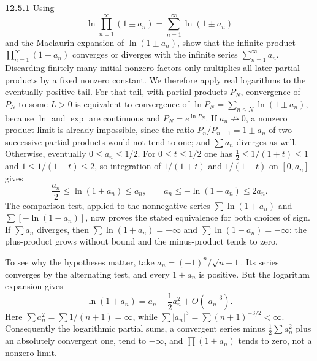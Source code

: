 \par\bigskip
\noindent\textbf{12.5.1}\quad {} Using
\[
\ln\prod_{n=1}^{\infty}(1\pm a_{n})=\sum_{n=1}^{\infty}\ln(1\pm a_{n})
\]
and the Maclaurin expansion of $\ln(1\pm a_{n})$, show that the infinite
product $\prod_{n=1}^{\infty}(1\pm a_{n})$ converges or diverges with the
infinite series $\sum_{n=1}^{\infty}a_{n}$.
\solution
{}
Discarding finitely many initial nonzero factors only multiplies all later
partial products by a fixed nonzero constant. We therefore apply real
logarithms to the eventually positive tail. For that tail, with partial
products $P_N$, convergence of $P_N$ to some $L>0$ is equivalent to
convergence of $\ln P_N=\sum_{n\le N}\ln(1\pm a_n)$, because $\ln$ and
$\exp$ are continuous and $P_N=e^{\ln P_N}$.
If $a_n\not\to0$, a nonzero product limit
is already impossible, since the ratio $P_n/P_{n-1}=1\pm a_n$ of two
successive partial products would not tend to one; and $\sum a_n$
diverges as well. Otherwise, eventually $0\le a_n\le1/2$.
For $0\le t\le1/2$ one has $\frac12\le1/(1+t)\le1$ and
$1\le1/(1-t)\le2$, so integration of $1/(1+t)$ and $1/(1-t)$ on
$[0,a_n]$ gives
\[
\frac{a_n}{2}\le\ln(1+a_n)\le a_n,\qquad
 a_n\le-\ln(1-a_n)\le2a_n.
\]
The comparison test, applied to the nonnegative series
$\sum\ln(1+a_n)$ and $\sum[-\ln(1-a_n)]$, now proves the stated
equivalence for both choices
of sign. If $\sum a_n$ diverges, then $\sum\ln(1+a_n)=+\infty$ and
$\sum\ln(1-a_n)=-\infty$: the plus-product grows without bound
and the minus-product tends to zero.

To see why the hypotheses matter, take
$a_n=(-1)^n/\sqrt{n+1}$. Its series converges by the alternating test,
and every $1+a_n$ is positive. But the logarithm expansion gives
\[
\ln(1+a_n)=a_n-\frac12a_n^2+O(|a_n|^3).
\]
Here $\sum a_n^2=\sum1/(n+1)=\infty$, while
$\sum|a_n|^3=\sum(n+1)^{-3/2}<\infty$. Consequently the logarithmic
partial sums, a convergent series minus $\frac12\sum a_n^2$ plus an
absolutely convergent one, tend
to $-\infty$, and $\prod(1+a_n)$ tends to zero, not a nonzero limit.

